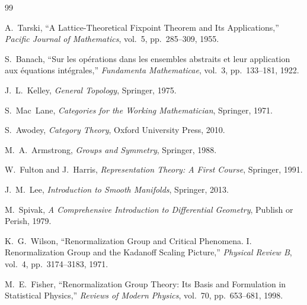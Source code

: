 \documentclass[11pt]{article}
\theoremstyle{definition}
\theoremstyle{plain}
\theoremstyle{remark}
\begin{document}
\begin{thebibliography}{99}


A.~Tarski,
\newblock ``A Lattice-Theoretical Fixpoint Theorem and Its Applications,''
\newblock \emph{Pacific Journal of Mathematics}, vol.~5, pp.~285--309, 1955.

S.~Banach,
\newblock ``Sur les opérations dans les ensembles abstraits et leur application
aux équations intégrales,''
\newblock \emph{Fundamenta Mathematicae}, vol.~3, pp.~133--181, 1922.

J.~L.~Kelley,
\newblock \emph{General Topology},
\newblock Springer, 1975.


S.~Mac~Lane,
\newblock \emph{Categories for the Working Mathematician},
\newblock Springer, 1971.

S.~Awodey,
\newblock \emph{Category Theory},
\newblock Oxford University Press, 2010.


M.~A.~Armstrong,
\newblock \emph{Groups and Symmetry},
\newblock Springer, 1988.

W.~Fulton and J.~Harris,
\newblock \emph{Representation Theory: A First Course},
\newblock Springer, 1991.


J.~M.~Lee,
\newblock \emph{Introduction to Smooth Manifolds},
\newblock Springer, 2013.

M.~Spivak,
\newblock \emph{A Comprehensive Introduction to Differential Geometry},
\newblock Publish or Perish, 1979.


K.~G.~Wilson,
\newblock ``Renormalization Group and Critical Phenomena. I. Renormalization
Group and the Kadanoff Scaling Picture,''
\newblock \emph{Physical Review B}, vol.~4, pp.~3174--3183, 1971.

M.~E.~Fisher,
\newblock ``Renormalization Group Theory: Its Basis and Formulation in
Statistical Physics,''
\newblock \emph{Reviews of Modern Physics}, vol.~70, pp.~653--681, 1998.


\end{thebibliography}
\end{document}
